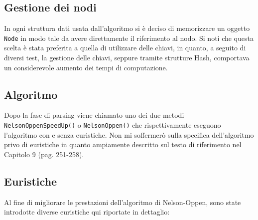 \documentclass[a4paper,11pt]{article}
\begin{document}
\subsection{Gestione dei nodi}
In ogni struttura dati usata dall'algoritmo si è deciso di memorizzare un oggetto {\tt Node} in modo tale da avere direttamente il riferimento al nodo.
Si noti che questa scelta è stata preferita a quella di utilizzare delle chiavi, in quanto, a seguito di diversi test, la gestione delle chiavi, seppure tramite strutture Hash, comportava un considerevole aumento dei tempi di computazione.
\subsection{Algoritmo}
Dopo la fase di parsing viene chiamato uno dei due metodi {\tt NelsonOppenSpeedUp()} o {\tt NelsonOppen()} che rispettivamente eseguono l'algoritmo con e senza euristiche.
Non mi soffermerò sulla specifica dell'algoritmo privo di euristiche in quanto ampiamente descritto sul testo di riferimento nel Capitolo 9 (pag. 251-258).

\subsection{Euristiche}
Al fine di migliorare le prestazioni dell'algoritmo di Nelson-Oppen, sono state introdotte diverse euristiche qui riportate in dettaglio:
\end{document}
